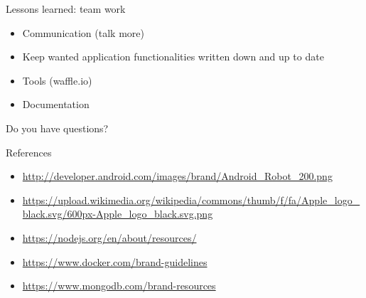 \documentclass[11pt]{beamer}
\newcommand{\todo}[1]{\raisebox{0pt}{\parbox{0pt}{\begin{large}\colorbox{red}{todo: #1}\end{large} \hspace*{0.05cm}}}}
\begin{document}
\begin{frame}{Lessons learned: team work}

  \begin{itemize}
    \item Communication (talk more)
    \item Keep wanted application functionalities written down and up to date
    \item Tools (waffle.io)
    \item Documentation
  \end{itemize}

\end{frame}


\begin{frame}{}

	\begin{center}

		{\Huge Do you have questions?}

    \end{center}

\end{frame}


\begin{frame}[allowframebreaks]{References}

	\nocite{*}
	{\tiny }


  {\tiny
    \begin{itemize}
      \item \url{http://developer.android.com/images/brand/Android_Robot_200.png}
      \item \url{https://upload.wikimedia.org/wikipedia/commons/thumb/f/fa/Apple_logo_black.svg/600px-Apple_logo_black.svg.png}
      \item \url{https://nodejs.org/en/about/resources/}
      \item \url{https://www.docker.com/brand-guidelines}
      \item \url{https://www.mongodb.com/brand-resources}
    \end{itemize}
  }
\end{frame}
\end{document}
